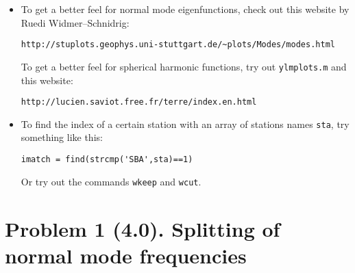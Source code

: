 \documentclass[11pt,titlepage,fleqn]{article}
\begin{document}
\begin{spacing}{1.0}
\begin{itemize}
\begin{itemize}
\item instrument response and Fourier analysis: \citet[][Ch.~6]{SteinWysession}
\item directivity: \citet[][Section 4.3.2]{SteinWysession} 
\item Sumatra earthquake: \citet{Lay2005,Ammon2005,Park2005,Ni2005,SSteinOkal2007}
\item normal modes: \citet[][Section 2.9]{SteinWysession} and \citet[][Ch.~8]{DT}. See also ``Computational details'' in Section 10.5.1 of DT.
\item PDFs of all referenced Sumatra papers can be found in one of two directories:
%
\begin{verbatim}
/home/admin/databases/SUMATRA/papers/
/home/admin/databases/SUMATRA/papers/SCIENCE_2005/
\end{verbatim}

\end{itemize}


\item To get a better feel for normal mode eigenfunctions, check out this website by Ruedi Widmer--Schnidrig:
%
\begin{verbatim}
http://stuplots.geophys.uni-stuttgart.de/~plots/Modes/modes.html
\end{verbatim}
%
To get a better feel for spherical harmonic functions, try out \verb+ylmplots.m+ and this website:
%
\begin{verbatim}
http://lucien.saviot.free.fr/terre/index.en.html
\end{verbatim}


\item To find the index of a certain station with an array of stations names \verb+sta+, try something like this:
%
\begin{verbatim}
imatch = find(strcmp('SBA',sta)==1)
\end{verbatim}
%
Or try out the commands \verb+wkeep+ and \verb+wcut+.

\end{itemize}

\end{spacing}


\section*{Problem 1 (4.0). Splitting of normal mode frequencies}
\end{document}
